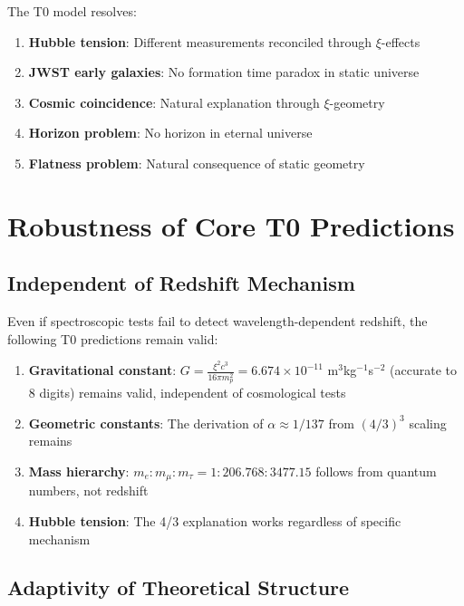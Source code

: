 \documentclass[12pt,a4paper]{article}
\theoremstyle{definition}
\begin{document}
	The T0 model resolves:
	\begin{enumerate}
		\item \textbf{Hubble tension}: Different measurements reconciled through $\xi$-effects
		\item \textbf{JWST early galaxies}: No formation time paradox in static universe
		\item \textbf{Cosmic coincidence}: Natural explanation through $\xi$-geometry
		\item \textbf{Horizon problem}: No horizon in eternal universe
		\item \textbf{Flatness problem}: Natural consequence of static geometry
	\end{enumerate}
	
	\section{Robustness of Core T0 Predictions}
	
	\subsection{Independent of Redshift Mechanism}
	
	Even if spectroscopic tests fail to detect wavelength-dependent redshift, the following T0 predictions remain valid:
	
	\begin{enumerate}
		\item \textbf{Gravitational constant}: $G = \frac{\xi^2 c^3}{16\pi m_p^2} = 6.674 \times 10^{-11}$ m$^3$kg$^{-1}$s$^{-2}$ (accurate to 8 digits) remains valid, independent of cosmological tests
		
		\item \textbf{Geometric constants}: The derivation of $\alpha \approx 1/137$ from $(4/3)^3$ scaling remains
		
		\item \textbf{Mass hierarchy}: $m_e : m_\mu : m_\tau = 1 : 206.768 : 3477.15$ follows from quantum numbers, not redshift
		
		\item \textbf{Hubble tension}: The 4/3 explanation works regardless of specific mechanism
	\end{enumerate}
	
	\subsection{Adaptivity of Theoretical Structure}
	
\end{document}
